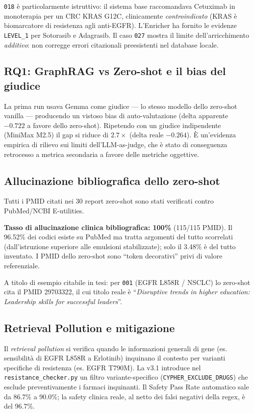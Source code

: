 \documentclass[11pt,a4paper]{article}
\newcommand{\code}[1]{\texttt{\small #1}}
\newcommand{\bench}[1]{\texttt{\small #1}}
\begin{document}
\noindent \bench{018} \`e particolarmente istruttivo: il sistema base raccomandava Cetuximab in monoterapia per un CRC KRAS G12C, clinicamente \emph{controindicato} (KRAS \`e biomarcatore di resistenza agli anti-EGFR). L'Enricher ha fornito le evidenze \code{LEVEL\_1} per Sotorasib e Adagrasib. Il caso \bench{027} mostra il limite dell'arricchimento \emph{additivo}: non corregge errori citazionali preesistenti nel database locale.

\subsection{RQ1: GraphRAG vs Zero-shot e il bias del giudice}
La prima run usava Gemma come giudice --- lo stesso modello dello zero-shot vanilla --- producendo un vistoso bias di auto-valutazione (delta apparente $-0.722$ a favore dello zero-shot). Ripetendo con un giudice indipendente (MiniMax M2.5) il gap si riduce di $2.7\times$ (delta reale $-0.264$). \`E un'evidenza empirica di rilievo sui limiti dell'LLM-as-judge, che \`e stato di conseguenza retrocesso a metrica secondaria a favore delle metriche oggettive.

\subsection{Allucinazione bibliografica dello zero-shot}
Tutti i PMID citati nei 30 report zero-shot sono stati verificati contro PubMed/NCBI E-utilities.

\begin{warnbox}
\textbf{Tasso di allucinazione clinica bibliografica: 100\%} (115/115 PMID). Il 96.52\% dei codici esiste su PubMed ma tratta argomenti del tutto scorrelati (dall'istruzione superiore alle emulsioni stabilizzate); solo il 3.48\% \`e del tutto inventato. I PMID dello zero-shot sono ``token decorativi'' privi di valore referenziale.
\end{warnbox}

\noindent A titolo di esempio citabile in tesi: per \bench{001} (EGFR L858R / NSCLC) lo zero-shot cita il PMID 29703322, il cui titolo reale \`e ``\emph{Disruptive trends in higher education: Leadership skills for successful leaders}''.

\subsection{Retrieval Pollution e mitigazione}
Il \emph{retrieval pollution} si verifica quando le informazioni generali di gene (es. sensibilit\`a di EGFR L858R a Erlotinib) inquinano il contesto per varianti specifiche di resistenza (es. EGFR T790M). La v3.1 introduce nel \code{resistance\_checker.py} un filtro variante-specifico (\code{CYPHER\_EXCLUDE\_DRUGS}) che esclude preventivamente i farmaci inquinanti. Il Safety Pass Rate automatico sale da 86.7\% a 90.0\%; la safety clinica reale, al netto dei falsi negativi della regex, \`e del 96.7\%.
\end{document}
